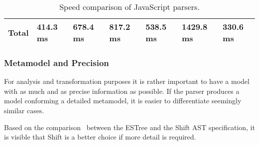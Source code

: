 \begin{table}[!htb]
\begin{tabular}{@{}lllllll@{}}
\textbf{Total}                                                & \textbf{414.3 ms}                                                & \textbf{678.4 ms}                                       & \textbf{817.2 ms}                                       & \textbf{538.5 ms}                                              & \textbf{1429.8 ms}                                      & \textbf{330.6 ms}                                                          \\ \bottomrule
\end{tabular}

\caption{Speed comparison of JavaScript parsers.}
\label{table:speed-comparison-of-parsers}
\end{table}

\subsubsection{Metamodel and Precision}
For analysis and transformation purposes it is rather important to have a model with as much and as precise information as possible. If the parser produces a model conforming a detailed metamodel, it is easier to differentiate seemingly similar cases.

Based on the comparison~\cite{shift-spec-comparison} between the ESTree and the Shift AST specification, it is visible that Shift is a better choice if more detail is required.


